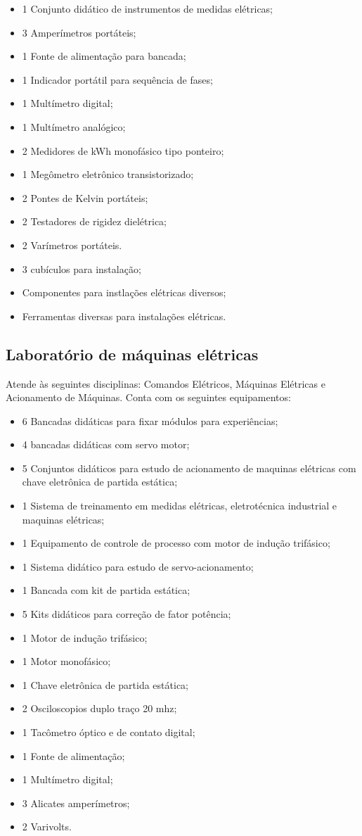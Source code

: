 \begin{itemize}
\item 1 Conjunto didático de instrumentos de medidas elétricas;
\item 3 Amperímetros portáteis;
\item 1 Fonte de alimentação para bancada;
\item 1 Indicador portátil para sequência de fases;
\item 1 Multímetro digital;
\item 1 Multímetro analógico;
\item 2 Medidores de kWh monofásico tipo ponteiro;
\item 1 Megômetro eletrônico transistorizado;
\item 2 Pontes de Kelvin portáteis;
\item 2 Testadores de rigidez dielétrica;
\item 2 Varímetros portáteis.
\item 3 cubículos para instalação;
\item Componentes para instlações elétricas diversos;
\item Ferramentas diversas para instalações elétricas. 
\end{itemize}

\subsection{Laboratório de máquinas elétricas}
Atende às seguintes disciplinas: Comandos Elétricos, Máquinas Elétricas e Acionamento de Máquinas. Conta com os seguintes equipamentos:

\begin{itemize}
\item 6 Bancadas didáticas para fixar módulos para experiências;
\item 4 bancadas didáticas com servo motor;
\item 5 Conjuntos didáticos para estudo de acionamento de maquinas elétricas com chave eletrônica de partida estática;
\item 1 Sistema de treinamento em medidas elétricas, eletrotécnica industrial e maquinas elétricas;
\item 1 Equipamento de controle de processo com motor de indução trifásico;
\item 1 Sistema didático para estudo de servo-acionamento;
\item 1 Bancada com kit de partida estática;
\item 5 Kits didáticos para correção de fator potência;
\item 1 Motor de indução trifásico;
\item 1 Motor monofásico;
\item 1 Chave eletrônica de partida estática;
\item 2 Osciloscopios duplo traço 20 mhz;
\item 1 Tacômetro óptico e de contato digital;
\item 1 Fonte de alimentação;
\item 1 Multímetro digital;
\item 3 Alicates amperímetros;
\item 2 Varivolts.
\end{itemize}

